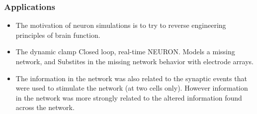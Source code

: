 \documentclass{beamer}
\begin{document}
\begin{frame}
\frametitle{Applications}
\begin{itemize}

\vfill \item The motivation of neuron simulations is to try to reverse engineering principles of brain function.

\vfill \item The dynamic clamp Closed loop, real-time NEURON. Models a missing network, and Substites in the missing network behavior with electrode arrays. 

 

\end{itemize}
\end{frame}


\begin{frame}
\begin{itemize}

\vfill \item The information in the network was also related to the synaptic events that were used to stimulate the network (at two cells only). However information in the network was more strongly related to the altered information found across the network.
\end{itemize}
\end{frame}
\end{document}

